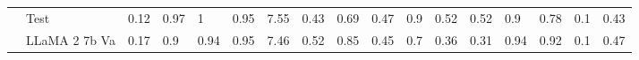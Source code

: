 \begin{table*}[t]
{\begin{tabular}{@{}ll|llll|llll|lll|ll|ll@{}}
                           & Test                 & 0.12                                                                    & 0.97                                                                     & 1                                                                     & 0.95                                                                  & 7.55                                                                    & 0.43                                                                  & 0.69                                                                  & 0.47                                                                   & 0.9                                                                     & 0.52                                                                  & 0.52                                                                   & 0.9                                                                    & 0.78                                                                   & 0.1                                                                      & 0.43                                                                     \\ \cmidrule{2-17}
                           & LLaMA 2 7b Va        & 0.17                                                                    & 0.9                                                                      & 0.94                                                                  & 0.95                                                                  & 7.46                                                                    & 0.52                                                                  & 0.85                                                                  & 0.45                                                                   & 0.7                                                                     & 0.36                                                                  & 0.31                                                                   & 0.94                                                                   & 0.92                                                                   & 0.1                                                                      & 0.47                                                                     \\

\end{tabular}}
\end{table*}
